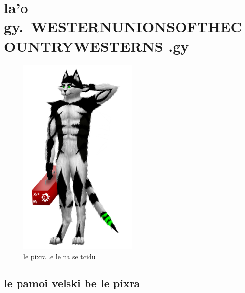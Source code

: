 \documentclass{report}
\newcommand\imageheight{10cm}
\begin{document}
\chapter{la'o gy.\ WESTERNUNIONSOFTHECOUNTRYWESTERNS .gy}
\begin{figure}[ht]
	\centering
	\includegraphics[height=\imageheight]{50x/toolbox/westernunionsofthecountrywesterns.png}
	\caption[center]{le pixra .e le na se tcidu}
\end{figure}
\section{le pamoi velski be le pixra}
\end{document}
